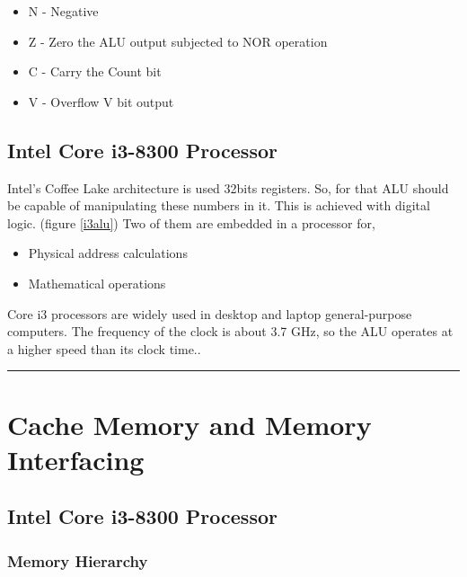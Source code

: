 \documentclass[a4paper,11pt]{article}
\begin{document}
\begin{itemize}
	\item 	N - Negative
\item	Z - Zero the ALU output subjected to NOR operation
\item 	C - Carry the Count bit
\item	V - Overflow V bit output
\end{itemize}

\subsection{Intel Core i3-8300 Processor}

Intel's Coffee Lake architecture is used 32bits registers. So, for that ALU should be capable of manipulating these numbers in it. This is achieved with digital logic. (figure \ref{i3alu}) Two of them are embedded in a processor for,
\begin{itemize}
	\item 	Physical address calculations
	\item	Mathematical operations

\end{itemize}

Core i3 processors are widely used in desktop and laptop general-purpose computers. The frequency of the clock is about 3.7 GHz, so the ALU operates at a higher speed than its clock time.\cite{howstuffworks}.




\vspace{1cm}\hrule
\section{Cache Memory and Memory Interfacing}

\subsection{Intel Core i3-8300 Processor}

\subsubsection{Memory Hierarchy}
\end{document}
